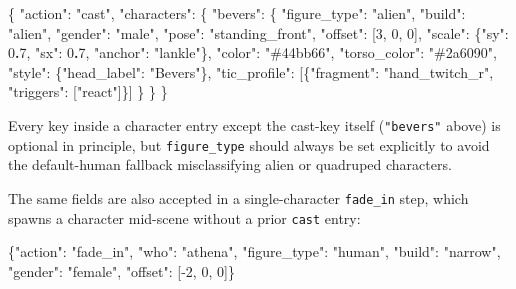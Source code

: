 \documentclass[
  11pt,
]{book}
\newenvironment{Shaded}{}{}
\newcommand{\DataTypeTok}[1]{\textcolor[rgb]{0.56,0.13,0.00}{#1}}
\newcommand{\DecValTok}[1]{\textcolor[rgb]{0.25,0.63,0.44}{#1}}
\newcommand{\ErrorTok}[1]{\textcolor[rgb]{1.00,0.00,0.00}{\textbf{#1}}}
\newcommand{\FunctionTok}[1]{\textcolor[rgb]{0.02,0.16,0.49}{#1}}
\newcommand{\OtherTok}[1]{\textcolor[rgb]{0.00,0.44,0.13}{#1}}
\newcommand{\StringTok}[1]{\textcolor[rgb]{0.25,0.44,0.63}{#1}}
\begin{document}
\begin{Shaded}
\begin{Highlighting}[]
\FunctionTok{\{}
  \DataTypeTok{"action"}\FunctionTok{:} \StringTok{"cast"}\FunctionTok{,}
  \DataTypeTok{"characters"}\FunctionTok{:} \FunctionTok{\{}
    \DataTypeTok{"bevers"}\FunctionTok{:} \FunctionTok{\{}
      \DataTypeTok{"figure\_type"}\FunctionTok{:} \StringTok{"alien"}\FunctionTok{,}
      \DataTypeTok{"build"}\FunctionTok{:} \StringTok{"alien"}\FunctionTok{,}
      \DataTypeTok{"gender"}\FunctionTok{:} \StringTok{"male"}\FunctionTok{,}
      \DataTypeTok{"pose"}\FunctionTok{:} \StringTok{"standing\_front"}\FunctionTok{,}
      \DataTypeTok{"offset"}\FunctionTok{:} \OtherTok{[}\DecValTok{3}\OtherTok{,} \DecValTok{0}\OtherTok{,} \DecValTok{0}\OtherTok{]}\FunctionTok{,}
      \DataTypeTok{"scale"}\FunctionTok{:} \FunctionTok{\{}\DataTypeTok{"sy"}\FunctionTok{:} \DecValTok{0}\ErrorTok{.}\DecValTok{7}\FunctionTok{,} \DataTypeTok{"sx"}\FunctionTok{:} \DecValTok{0}\ErrorTok{.}\DecValTok{7}\FunctionTok{,} \DataTypeTok{"anchor"}\FunctionTok{:} \StringTok{"lankle"}\FunctionTok{\},}
      \DataTypeTok{"color"}\FunctionTok{:} \StringTok{"\#44bb66"}\FunctionTok{,}
      \DataTypeTok{"torso\_color"}\FunctionTok{:} \StringTok{"\#2a6090"}\FunctionTok{,}
      \DataTypeTok{"style"}\FunctionTok{:} \FunctionTok{\{}\DataTypeTok{"head\_label"}\FunctionTok{:} \StringTok{"Bevers"}\FunctionTok{\},}
      \DataTypeTok{"tic\_profile"}\FunctionTok{:} \OtherTok{[}\FunctionTok{\{}\DataTypeTok{"fragment"}\FunctionTok{:} \StringTok{"hand\_twitch\_r"}\FunctionTok{,} \DataTypeTok{"triggers"}\FunctionTok{:} \OtherTok{[}\StringTok{"react"}\OtherTok{]}\FunctionTok{\}}\OtherTok{]}
    \FunctionTok{\}}
  \FunctionTok{\}}
\FunctionTok{\}}
\end{Highlighting}
\end{Shaded}

Every key inside a character entry except the cast-key itself
(\texttt{"bevers"} above) is optional in principle, but
\texttt{figure\_type} should always be set explicitly to avoid the
default-human fallback misclassifying alien or quadruped characters.

The same fields are also accepted in a single-character
\texttt{fade\_in} step, which spawns a character mid-scene without a
prior \texttt{cast} entry:

\begin{Shaded}
\begin{Highlighting}[]
\FunctionTok{\{}\DataTypeTok{"action"}\FunctionTok{:} \StringTok{"fade\_in"}\FunctionTok{,} \DataTypeTok{"who"}\FunctionTok{:} \StringTok{"athena"}\FunctionTok{,}
 \DataTypeTok{"figure\_type"}\FunctionTok{:} \StringTok{"human"}\FunctionTok{,} \DataTypeTok{"build"}\FunctionTok{:} \StringTok{"narrow"}\FunctionTok{,} \DataTypeTok{"gender"}\FunctionTok{:} \StringTok{"female"}\FunctionTok{,}
 \DataTypeTok{"offset"}\FunctionTok{:} \OtherTok{[}\DecValTok{{-}2}\OtherTok{,} \DecValTok{0}\OtherTok{,} \DecValTok{0}\OtherTok{]}\FunctionTok{\}}
\end{Highlighting}
\end{Shaded}
\end{document}
